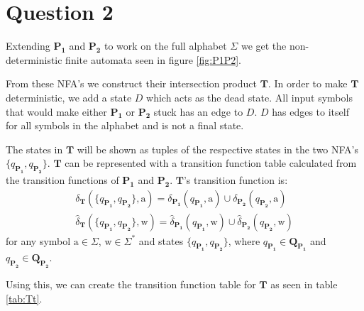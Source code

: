 \section*{Question 2}
Extending $\mathbf{P_1}$ and $\mathbf{P_2}$ to work on the full alphabet $\Sigma$ we get the non-deterministic finite automata seen in figure \ref{fig:P1P2}.

\vspace{1 cm}


From these NFA’s we construct their intersection product $\mathbf{T}$. In order to make $\mathbf{T}$ deterministic, we add a state $D$ which acts as the dead state. All input symbols that would make either $\mathbf{P_1}$ or $\mathbf{P_2}$ stuck has an edge to $D$. $D$ has edges to itself for all symbols in the alphabet and is not a final state. 

The states in $\mathbf{T}$ will be shown as tuples of the respective states in the two NFA’s $\{q_{\mathbf{P_1}} , q_{\mathbf{P_2}} \}$. $\mathbf{T}$ can be represented with a transition function table calculated from the transition functions of $\mathbf{P_1}$ and $\mathbf{P_2}$. $\mathbf{T}$’s transition function is:
\begin{gather*}
    \delta_{\mathbf{T}}(\{q_{\mathbf{P_1}}, q_{\mathbf{P_2}}\}, \mathrm{a}) = \delta_\mathbf{P_1}(q_{\mathbf{P_1}}, \mathrm{a}) \cup \delta_\mathbf{P_2}(q_{\mathbf{P_2}}, \mathrm{a}) \\ 
    \hat{\delta}_{\mathbf{T}}(\{q_{\mathbf{P_1}}, q_{\mathbf{P_2}}\}, \mathrm{w}) = \hat{\delta}_\mathbf{P_1}(q_{\mathbf{P_1}}, \mathrm{w}) \cup \hat{\delta}_\mathbf{P_2}(q_{\mathbf{P_2}}, \mathrm{w})
\end{gather*} 
\quad for any symbol $\mathrm{a} \in \Sigma$, $\mathrm{w} \in \Sigma^*$ and states $\{q_{\mathbf{P_1}}, q_{\mathbf{P_2}}\}$, where $q_{\mathbf{P_1}} \in \mathbf{Q_{P_1}}$ and $q_{\mathbf{P_2}} \in \mathbf{Q_{P_2}}$. 

Using this, we can create the transition function table for $\mathbf{T}$ as seen in table \ref{tab:Tt}.

